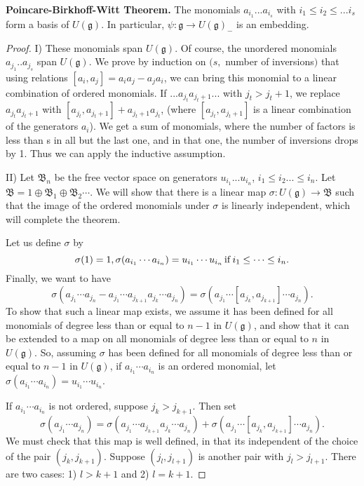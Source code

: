 \documentclass[12pt, fullpage]{article}
\newcommand{\g}{\mathfrak{g}}
\newcommand{\B}{\mathfrak{B}}
\begin{document}
{\bf Poincare-Birkhoff-Witt Theorem.}  The monomials $a_{i_1} ... a_{i_s}$ with $i_1 \leq i_2 \leq ... i_s$ form a basis of $U(\g)$.  In particular, $\psi : \g \rightarrow U(\g)_-$ is an embedding.  
\begin{proof}

I)  These monomials span $U(\g)$.  Of course, the unordered monomials $a_{j_1} .. a_{j_s}$ span $U(\g)$.  We prove by induction on $(s, $ number of inversions$)$ that using relations $[a_i, a_j]=a_i a_j - a_j a_i$, we can bring this monomial to a linear combination of ordered monomials.  If $...a_{j_t} a_{j_t+1} ...$ with $j_t > j_t+1$, we replace $a_{j_t} a_{j_t+1}$ with $[a_{j_t}, a_{j_t+1}] + a_{j_t+1} a_{j_t}$, (where $[a_{j_t}, a_{j_t+1}]$ is a linear combination of the generators $a_i$).  We get a sum of monomials, where the number of factors is less than s in all but the last one, and in that one, the number of inversions drops by 1.  Thus we can apply the inductive assumption.  

II)  Let $\B_n$ be the free vector space on generators $u_{i_1}... u_{i_n}$, $i_1 \leq i_2... \leq i_n$.  Let $\B = 1 \oplus \B_1 \oplus \B_2 \cdots$.  We will show that there is a linear map $\sigma : U(\g) \rightarrow \B$ such that the image of the ordered monomials under $\sigma$ is linearly independent, which will complete the theorem.  

Let us define $\sigma$ by 
\begin{equation}
\sigma (1) = 1, \sigma (a_{i_1} \cdots a_{i_n}) = u_{i_1} \cdots u_{i_n} {\rm \, if \,} i_1 \leq \cdots \leq i_n.
\end{equation}
Finally, we want to have
\begin{equation}
\sigma (a_{j_1}\cdots a_{j_n} - a_{j_1}\cdots a_{j_{k+1}} a_{j_k} \cdots a_{j_n}) = \sigma (a_{j_1} \cdots [ a_{j_k},a_{j_{k+1}}] \cdots a_{j_n}).  
\end{equation}
To show that such a linear map exists, we assume it has been defined for all monomials of degree less than or equal to  $n-1$ in $U(\g)$, and show that it can be extended to a map on all monomials of degree less than or equal to $n$ in $U(\g)$.  So, assuming $\sigma$ has been defined for all monomials of degree less than or equal to  $n-1$ in $U(\g)$, if $a_{i_1} \cdots a_{i_n}$ is an ordered monomial, let $\sigma (a_{i_1} \cdots a_{i_n}) = u_{i_1} \cdots u_{i_n}$.  

If $a_{i_1} \cdots a_{i_n}$ is not ordered, suppose $j_k > j_{k+1}$.  Then set 
\begin{equation}
\sigma (a_{j_1}\cdots a_{j_n}) = \sigma (a_{j_1}\cdots a_{j_{k+1}} a_{j_k} \cdots a_{j_n}) + \sigma (a_{j_1} \cdots [ a_{j_k},a_{j_{k+1}}] \cdots a_{j_n}). 
\end{equation}
We must check that this map is well defined, in that its independent of the choice of the pair $(j_k, j_{k+1})$.  Suppose $(j_l, j_{l+1})$ is another pair with  $j_l > j_{l+1}$.  There are two cases:  1) $l>k+1$ and 2) $l=k+1$.  


\end{proof}
\end{document}
